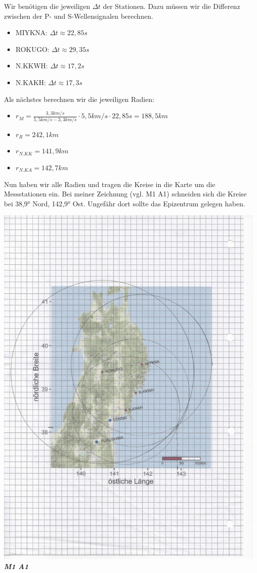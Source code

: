 \documentclass{article}
\begin{document}
Wir benötigen die jeweiligen $\Delta t$ der Stationen. Dazu müssen wir die Differenz zwischen der P- und S-Wellensignalen berechnen.
\begin{itemize}
	\item MIYKNA: $\Delta t \approx 22,85s$ 
	\item ROKUGO: $\Delta t \approx 29,35s$ 
	\item N.KKWH: $\Delta t \approx 17,2s$ 
	\item N.KAKH: $\Delta t \approx 17,3s$ 
\end{itemize}
Als nächstes berechnen wir die jeweiligen Radien: 
\begin{itemize}
	\item $r_M = \frac{3,3km/s}{5,5 km/s - 3,3 km/s} \cdot 5,5 km/s \cdot 22,85 s = 188,5 km$
	\item $r_R = 242,1km$
	\item $r_{N.KK} = 141,9km$
	\item $r_{N.KA} = 142,7km$
\end{itemize}
Nun haben wir alle Radien und tragen die Kreise in die Karte um die Messstationen ein. 
Bei meiner Zeichnung (vgl. M1 A1) schneiden sich die Kreise bei 38,9° Nord, 142,9° Ost. Ungefähr dort sollte das Epizentrum gelegen haben. 
\begin{center}
	\includegraphics[scale=0.4]{PhotoScan.jpg}\\
	\textit{\textbf{M1 A1}}
\end{center}
\end{document}
